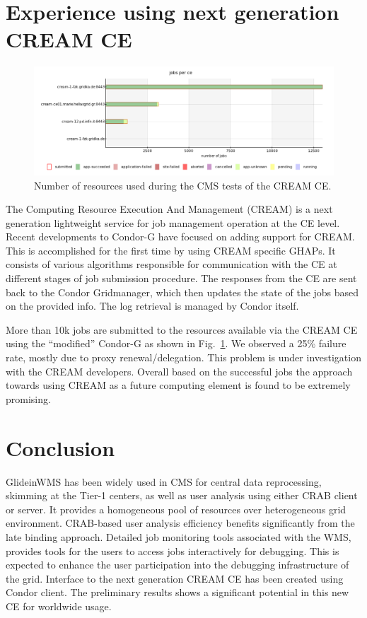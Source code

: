 \documentclass[a4paper]{jpconf}
\begin{document}
\section{Experience using next generation CREAM CE}
\begin{figure}
\begin{center}
\includegraphics[scale=0.45]{cms_cream}
\end{center}
\caption{Number of resources used during the CMS tests of the CREAM CE.}
\label{fig:cms_cream}
\end{figure}
The Computing Resource Execution And Management (CREAM) is a next generation lightweight service 
for job management operation at the CE level. Recent developments to Condor-G have focused on adding 
support for CREAM. This is accomplished for the first time by using CREAM specific GHAPs. It consists 
of various algorithms responsible for communication with the CE at different stages of job submission
procedure. The responses from the CE are sent back to the Condor Gridmanager, which then updates 
the state of the jobs based on the provided info. The log retrieval is managed by Condor itself.

More than 10k jobs are submitted to the resources available via the CREAM CE using the ``modified'' Condor-G as 
shown in Fig.~\ref{fig:cms_cream}. We observed a 25\% failure rate, mostly due to proxy renewal/delegation. 
This problem is under investigation with the CREAM developers. Overall based on the successful jobs
the approach towards using CREAM as a future computing element is found to be extremely promising.
\section{Conclusion}
GlideinWMS has been widely used in CMS for central data reprocessing, skimming at the Tier-1 centers, as well
as user analysis using either CRAB client or server. It provides a homogeneous pool of resources over
heterogeneous grid environment. CRAB-based user analysis efficiency benefits significantly from the late
binding approach. Detailed job monitoring tools associated with the WMS, provides tools for the users to access 
jobs interactively for debugging. This is expected to enhance the user participation into the debugging 
infrastructure of the grid. Interface to the next generation CREAM CE has been created using Condor client. 
The preliminary results shows a significant potential in this new CE for worldwide usage. 
\end{document}
